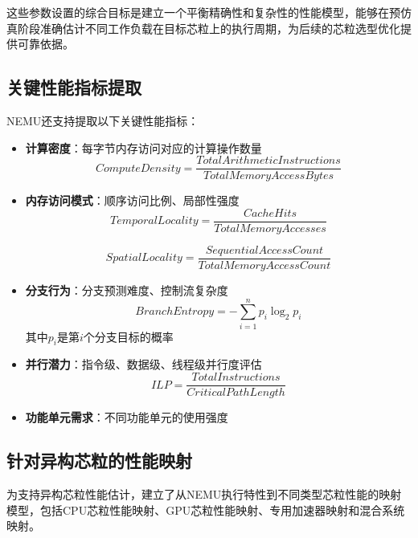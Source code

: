 \documentclass[bachelor]{thesis-uestc}
\begin{document}
这些参数设置的综合目标是建立一个平衡精确性和复杂性的性能模型，能够在预仿真阶段准确估计不同工作负载在目标芯粒上的执行周期，为后续的芯粒选型优化提供可靠依据。

\subsection{关键性能指标提取}

NEMU还支持提取以下关键性能指标：

\begin{itemize}
    \item \textbf{计算密度}：每字节内存访问对应的计算操作数量
    \begin{equation}
    ComputeDensity = \frac{TotalArithmeticInstructions}{TotalMemoryAccessBytes}
    \end{equation}
    
    \item \textbf{内存访问模式}：顺序访问比例、局部性强度
    \begin{equation}
    TemporalLocality = \frac{CacheHits}{TotalMemoryAccesses}
    \end{equation}
    
    \begin{equation}
    SpatialLocality = \frac{SequentialAccessCount}{TotalMemoryAccessCount}
    \end{equation}
    
    \item \textbf{分支行为}：分支预测难度、控制流复杂度
    \begin{equation}
    BranchEntropy = -\sum_{i=1}^{n} p_i \log_2 p_i
    \end{equation}
    其中$p_i$是第$i$个分支目标的概率
    
    \item \textbf{并行潜力}：指令级、数据级、线程级并行度评估
    \begin{equation}
    ILP = \frac{TotalInstructions}{CriticalPathLength}
    \end{equation}
    
    \item \textbf{功能单元需求}：不同功能单元的使用强度
\end{itemize}

\subsection{针对异构芯粒的性能映射}

为支持异构芯粒性能估计，建立了从NEMU执行特性到不同类型芯粒性能的映射模型，包括CPU芯粒性能映射、GPU芯粒性能映射、专用加速器映射和混合系统映射。
\end{document}
